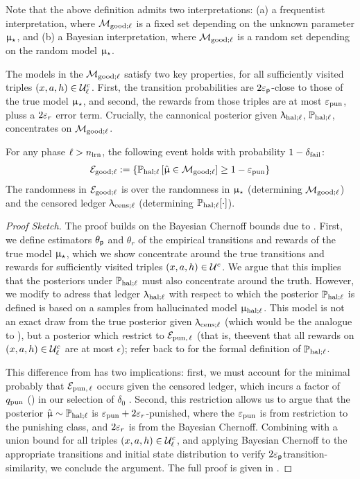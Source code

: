 Note that the above definition admits two interpretations: (a) a frequentist interpretation, where $\mathcal{M}_{\mathrm{good};\ell}$ is a fixed set depending on the unknown parameter $\upmu_{\star}$, and (b) a Bayesian interpretation, where $\mathcal{M}_{\mathrm{good};\ell}$ is a random set depending on the random model $\upmu_{\star}$.

The models in the $\mathcal{M}_{\mathrm{good};\ell}$ satisfy two key properties, for all sufficiently visited triples $(x,a,h) \in \mathcal{U}_{\ell}^c$. First, the transition probabilities are $2\varepsilon_{\mathsf{p}}$-close to those of the true model $\upmu_{\star}$, and second, the rewards from those triples are at most $\varepsilon_{\mathrm{pun}}$, pluss a  $2\varepsilon_{r}$ error term. Crucially, the cannonical posterior given $\uplambda_{\mathrm{hal};\ell}$, $\operatorname{\mathbb{P}}_{\mathrm{hal};\ell}$, concentrates on $\mathcal{M}_{\mathrm{good};\ell}$.
\begin{lemma}\label{lem:hallucination_good_event}
For any phase $\ell > n_{\mathrm{lrn}}$, the following event holds with probability $ 1- \delta_{\mathrm{fail}}$:
\begin{align*}
\mathcal{E}_{\mathrm{good};\ell} := \{\operatorname{\mathbb{P}}_{\mathrm{hal};\ell}\left[ \hat{\upmu} \in \mathcal{M}_{\mathrm{good};\ell}\right]\ge 1 - \varepsilon_{\mathrm{pun}}\}
\end{align*}
The randomness in $\mathcal{E}_{\mathrm{good};\ell} $ is over the randomness in $\upmu_{\star}$ (determining $\mathcal{M}_{\mathrm{good};\ell}$) and the censored ledger $\uplambda_{\mathrm{cens};\ell}$ (determining $\operatorname{\mathbb{P}}_{\mathrm{hal};\ell}[\cdot]$).
\end{lemma}
\begin{proof}[Proof Sketch] The proof builds on the Bayesian Chernoff bounds due to \citep{Selke-PoIE-ec21}. First, we define estimators $\theta_{\mathsf{p}}$ and $\theta_r$ of the empirical transitions and rewards of the true model $\upmu_{\star}$, which we show concentrate around the true transitions and rewards for sufficiently visited triples $(x,a,h) \in \mathcal{U}^c$. We argue that this implies that the posteriors under $\operatorname{\mathbb{P}}_{\mathrm{hal};\ell}$ must also concentrate around the truth. However, we modify \citep{Selke-PoIE-ec21} to adress that ledger $\uplambda_{\mathrm{hal};\ell}$ with respect to which the posterior $\operatorname{\mathbb{P}}_{\mathrm{hal};\ell}$ is defined is based on a samples from hallucinated model $\upmu_{\mathrm{hal};\ell}$. This model is not an exact draw from the true posterior given $\uplambda_{\mathrm{cens};\ell}$ (which would be the analogue to \citep{Selke-PoIE-ec21}), but a  posterior which \emph restrict to $ \mathcal{E}_{\mathrm{pun},\,\ell}$ (that is, theevent that all rewards on $(x,a,h) \in \mathcal{U}_{\ell}^c$ are at most $\epsilon$); refer back to  for the formal definition of $\operatorname{\mathbb{P}}_{\mathrm{hal};\ell}$.

This difference from  \citep{Selke-PoIE-ec21} has two implications: first, we must account for the minimal probably that $\mathcal{E}_{\mathrm{pun},\,\ell}$ occurs given the censored ledger, which incurs a factor of $q_{\mathrm{pun}}$ () in our selection of $\delta_0$ . Second, this restriction allows us to argue that the posterior $\hat{\upmu} \sim \operatorname{\mathbb{P}}_{\mathrm{hal};\ell}$ is $\varepsilon_{\mathrm{pun}} + 2\varepsilon_{r}$-punished, where the  $\varepsilon_{\mathrm{pun}}$ is from restriction to the punishing class, and $2\varepsilon_{r}$ is from the Bayesian Chernoff. Combining with a union bound for all triples $(x,a,h) \in \mathcal{U}^c_{\ell}$, and applying Bayesian Chernoff to the appropriate transitions and initial state distribution to verify $2\varepsilon_{\mathsf{p}}$transition-similarity, we conclude the argument. The full proof is given in  .
\end{proof}
